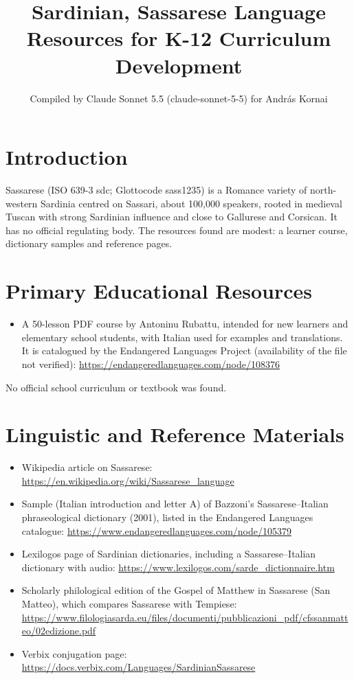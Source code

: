 \documentclass[12pt]{article}
\title{Sardinian, Sassarese Language Resources for K-12 Curriculum Development}
\author{Compiled by Claude Sonnet 5.5 (claude-sonnet-5-5) for Andr\'as Kornai}
\date{}
\begin{document}
\maketitle

\section{Introduction}
Sassarese (ISO 639-3 sdc; Glottocode sass1235) is a Romance variety of north-western Sardinia centred on Sassari, about 100,000 speakers, rooted in medieval Tuscan with strong Sardinian influence and close to Gallurese and Corsican. It has no official regulating body. The resources found are modest: a learner course, dictionary samples and reference pages.

\section{Primary Educational Resources}
\begin{itemize}
\item A 50-lesson PDF course by Antoninu Rubattu, intended for new learners and elementary school students, with Italian used for examples and translations. It is catalogued by the Endangered Languages Project (availability of the file not verified): \url{https://endangeredlanguages.com/node/108376}
\end{itemize}
No official school curriculum or textbook was found.

\section{Linguistic and Reference Materials}
\begin{itemize}
\item Wikipedia article on Sassarese: \url{https://en.wikipedia.org/wiki/Sassarese_language}
\item Sample (Italian introduction and letter A) of Bazzoni's Sassarese--Italian phraseological dictionary (2001), listed in the Endangered Languages catalogue: \url{https://www.endangeredlanguages.com/node/105379}
\item Lexilogos page of Sardinian dictionaries, including a Sassarese--Italian dictionary with audio: \url{https://www.lexilogos.com/sarde_dictionnaire.htm}
\item Scholarly philological edition of the Gospel of Matthew in Sassarese (San Matteo), which compares Sassarese with Tempiese: \url{https://www.filologiasarda.eu/files/documenti/pubblicazioni_pdf/cfssanmatteo/02edizione.pdf}
\item Verbix conjugation page: \url{https://docs.verbix.com/Languages/SardinianSassarese}
\end{itemize}
\end{document}
